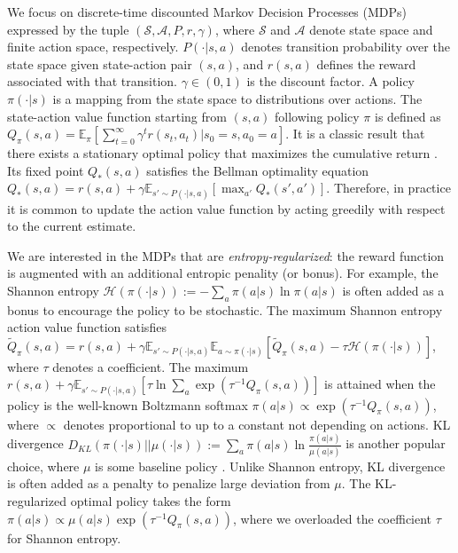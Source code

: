\documentclass{article}
\newcommand{\AdaBracket}[1]{\left(#1\right)}
\newcommand{\AdaRectBracket}[1]{\left[#1\right]}
\newcommand{\expectation}[2]{\mathbb{E}_{#1}\AdaRectBracket{#2}}
\newcommand{\KLany}[2]{D_{\!K\!L}\!\left(#1 \left|  \right| #2 \right)}
\newcommand{\entropyany}[1]{\mathcal{H}\left( #1 \right)}
\begin{document}
We focus on discrete-time discounted Markov Decision Processes (MDPs) expressed by the tuple $(\mathcal{S}, \mathcal{A}, P,  r,  \gamma)$, where $\mathcal{S}$ and $\mathcal{A}$ denote state space and finite action space, respectively. 
$P(\cdot |s,a)$ denotes transition probability over the state space given state-action pair $(s,a)$,  
and $r(s,a)$ defines the reward associated with that transition. 
$\gamma \in (0,1)$ is the discount factor.
A policy $\pi(\cdot|s)$ is a mapping from the state space to distributions over actions.
The state-action value function starting from $(s, a)$ following policy $\pi$ is defined as  $Q_{\pi}(s,a) = \mathbb{E}_{\pi}\AdaRectBracket{\sum_{t=0}^{\infty} \gamma^t r(s_t, a_t) | s_0=s, a_0 = a }$.
It is a classic result that there exists a stationary optimal policy that maximizes the cumulative return \cite{Puterman1994}.
Its fixed point $Q_{*}(s,a)$ satisfies the Bellman optimality equation $Q_{*}(s,a) = r(s,a) + \gamma  \mathbb{E}_{s'\sim P(\cdot|s,a)}\!\AdaRectBracket{\max_{a'}Q_*(s',a')}$.
Therefore, in practice it is common to update the action value function by acting greedily with respect to the current estimate.


We are interested in the MDPs that are \emph{entropy-regularized}: the reward function is augmented with an additional entropic penality (or bonus).
For example, the Shannon entropy $\entropyany{\pi(\cdot| s)} := -\sum_a \pi(a|s)\ln \pi(a|s)$ is often added as a bonus to encourage the policy to be stochastic.
The maximum Shannon entropy action value function satisfies $\tilde{Q}_{\pi}(s,a) = r(s,a) + \gamma \mathbb{E}_{s' \sim P(\cdot | s,a )}\mathbb{E}_{a\sim \pi(\cdot|s)}\AdaRectBracket{\tilde{Q}_{\pi}(s,a) - \tau\entropyany{\pi(\cdot|s)}}$, where $\tau$ denotes a coefficient.
The maximum $r(s,a) + \gamma \expectation{s'\sim P(\cdot|s,a)}{\tau \ln\sum_{a} \exp\AdaBracket{\tau^{-1}Q_{\pi}(s,a)}}$ is attained when the policy is the well-known Boltzmann softmax $\pi(a|s) \propto \exp\AdaBracket{\tau^{-1}Q_{\pi}(s,a)}$, where $\propto$ denotes proportional to up to a constant not depending on actions.
KL divergence $\KLany{\pi(\cdot|s)}{\mu(\cdot|s)}:= \sum_a \pi(a|s)\ln\frac{\pi(a|s)}{\mu(a|s)}$ is another popular choice, where $\mu$ is some baseline policy \cite{azar2012dynamic,Rawlik2013-SOCRL,vieillard2020leverage}.
Unlike Shannon entropy, KL divergence is often added as a penalty to penalize large deviation from $\mu$.
The KL-regularized optimal policy takes the form $\pi(a|s) \propto \mu(a|s)\exp\AdaBracket{\tau^{-1}Q_{\pi}(s,a)}$, where we overloaded the coefficient $\tau$ for Shannon entropy.
\end{document}
